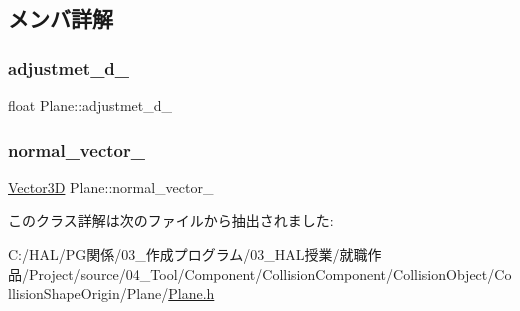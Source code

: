 \subsection{メンバ詳解}
\mbox{\label{class_plane_ab43e3263bd879ea710936d85cacb6006}} 
\subsubsection{\texorpdfstring{adjustmet\+\_\+d\+\_\+}{adjustmet\_d\_}}
{\footnotesize\ttfamily float Plane\+::adjustmet\+\_\+d\+\_\+}

\mbox{\label{class_plane_abdf97ffa29f452b0faaae0b7d06f4ee5}} 
\subsubsection{\texorpdfstring{normal\+\_\+vector\+\_\+}{normal\_vector\_}}
{\footnotesize\ttfamily \mbox{\hyperlink{class_vector3_d}{Vector3D}} Plane\+::normal\+\_\+vector\+\_\+}



このクラス詳解は次のファイルから抽出されました\+:\begin{DoxyCompactItemize}
\item 
C\+:/\+H\+A\+L/\+P\+G関係/03\+\_\+作成プログラム/03\+\_\+\+H\+A\+L授業/就職作品/\+Project/source/04\+\_\+\+Tool/\+Component/\+Collision\+Component/\+Collision\+Object/\+Collision\+Shape\+Origin/\+Plane/\mbox{\hyperlink{_plane_8h}{Plane.\+h}}\end{DoxyCompactItemize}
